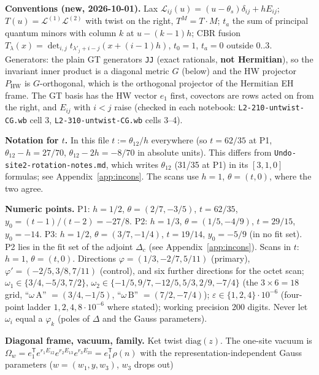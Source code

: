 \documentclass[10pt]{article}
\newcommand{\nb}[1]{\texttt{#1}}
\begin{document}
\textbf{Conventions (new, 2026-10-01).} Lax $\mathcal L_{ij}(u)=(u-\theta_s)\delta_{ij}+hE_{ij}$; $T(u)=\mathcal L^{(1)}\mathcal L^{(2)}$ with twist on the right, $T^M=T\cdot M$; $t_a$ the sum of principal quantum minors with column $k$ at $u-(k-1)h$; CBR fusion $T_\lambda(x)=\det_{i,j}t_{\lambda'_j+i-j}(x+(i-1)h)$, $t_0=1$, $t_a=0$ outside $0..3$. Generators: the plain GT generators \nb{JJ} (exact rationals, \textbf{not Hermitian}), so the invariant inner product is a diagonal metric $G$ (below) and the HW projector $P_{\mathrm{HW}}$ is $G$-orthogonal, which is the orthogonal projector of the Hermitian EH frame. The GT basis has the HW vector $e_1$ first, covectors are rows acted on from the right, and $E_{ij}$ with $i<j$ raise (checked in each notebook: \nb{L2-\allowbreak{}210-\allowbreak{}untwist-\allowbreak{}CG.\allowbreak{}wb} cell 3, \nb{L2-\allowbreak{}310-\allowbreak{}untwist-\allowbreak{}CG.\allowbreak{}wb} cells 3--4).

\textbf{Notation for $t$.} In this file $t:=\theta_{12}/h$ everywhere (so $t=62/35$ at P1, $\theta_{12}-h=27/70$, $\theta_{12}-2h=-8/70$ in absolute units). This differs from \nb{Undo-\allowbreak{}site2-\allowbreak{}rotation-\allowbreak{}notes.\allowbreak{}md}, which writes $\theta_{12}$ (31/35 at P1) in its $[3,1,0]$ formulas; see Appendix~\ref{app:incons}. The scans use $h=1$, $\theta=(t,0)$, where the two agree.

\textbf{Numeric points.} P1: $h=1/2$, $\theta=(2/7,-3/5)$, $t=62/35$, $y_0=(t-1)/(t-2)=-27/8$. P2: $h=1/3$, $\theta=(1/5,-4/9)$, $t=29/15$, $y_0=-14$. P3: $h=1/2$, $\theta=(3/7,-1/4)$, $t=19/14$, $y_0=-5/9$ (in no fit set). P2 lies in the fit set of the adjoint $\Delta_c$ (see Appendix~\ref{app:incons}). Scans in $t$: $h=1$, $\theta=(t,0)$. Directions $\varphi=(1/3,-2/7,5/11)$ (primary), $\varphi'=(-2/5,3/8,7/11)$ (control), and six further directions for the octet scan; $\omega_1\in\{3/4,-5/3,7/2\}$, $\omega_2\in\{-1/5,9/7,-12/5,5/3,2/9,-7/4\}$ (the $3\times6=18$ grid, ``$\omega\,\mathrm{A}$'' $=(3/4,-1/5)$, ``$\omega\,\mathrm{B}$'' $=(7/2,-7/4)$); $\varepsilon\in\{1,2,4\}\cdot10^{-6}$ (four-point ladder $1,2,4,8\cdot10^{-6}$ where stated); working precision 200 digits. Never let $\omega_i$ equal a $\varphi_k$ (poles of $\Delta$ and the Gauss parameters).

\textbf{Diagonal frame, vacuum, family.} Ket twist $\mathrm{diag}(z)$. The one-site vacuum is $\Omega_w=e_1^{\mathsf T}e^{r_1E_{12}}e^{r_2E_{13}}e^{r_3E_{23}}=e_1^{\mathsf T}\rho(n)$ with the representation-independent Gauss parameters ($w=(w_1,y,w_3)$, $w_3$ drops out)
\end{document}
